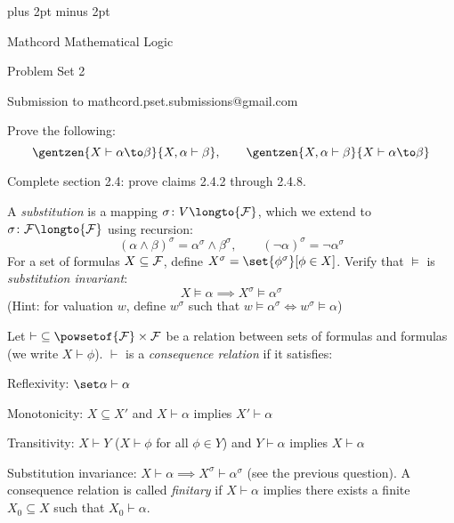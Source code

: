 

\parindent=0pt
\parskip=3pt plus 2pt minus 2pt



\centerline{Mathcord Mathematical Logic}
\centerline{Problem Set 2}
\centerline{Submission to mathcord.pset.submissions@gmail.com}

\bprob

    Prove the following:
    $$ \gentzen{X\vdash\alpha\to\beta}{X,\alpha\vdash\beta},\qquad
    \gentzen{X,\alpha\vdash\beta}{X\vdash\alpha\to\beta} $$

\eprob

\bprob

    Complete section 2.4: prove claims 2.4.2 through 2.4.8.

\eprob

\bprob

    A {\it substitution} is a mapping $\sigma\colon V\longto{\cal F}$, which we extend to
    $\sigma\colon{\cal F}\longto{\cal F}$ using recursion:
    $$ (\alpha\land\beta)^\sigma = \alpha^\sigma\land\beta^\sigma,\qquad
    (\neg\alpha)^\sigma = \neg\alpha^\sigma $$
    For a set of formulas $X\subseteq{\cal F}$, define $X^\sigma=\set{\phi^\sigma}[\phi\in X]$.
    Verify that $\vDash$ is {\it substitution invariant}:
    $$ X\vDash\alpha \implies X^\sigma\vDash\alpha^\sigma $$
    (Hint: for valuation $w$, define $w^\sigma$ such that
    $w\vDash\alpha^\sigma\iff w^\sigma\vDash\alpha$)

\eprob

\bprob

    Let ${\vdash}\subseteq\powsetof{\cal F}\times{\cal F}$ be a relation between sets of formulas
    and formulas (we write $X\vdash\phi$).
    $\vdash$ is a {\it consequence relation} if it satisfies:
    \benum
        \item Reflexivity: $\set\alpha\vdash\alpha$
        \item Monotonicity: $X\subseteq X'$ and $X\vdash\alpha$ implies $X'\vdash\alpha$
        \item Transitivity: $X\vdash Y$ ($X\vdash\phi$ for all $\phi\in Y$) and $Y\vdash\alpha$
        implies $X\vdash\alpha$
        \item Substitution invariance: $X\vdash\alpha\implies X^\sigma\vdash\alpha^\sigma$ (see
        the previous question).
    \eenum
    A consequence relation is called {\it finitary} if $X\vdash\alpha$ implies there exists a
    finite $X_0\subseteq X$ such that $X_0\vdash\alpha$.

